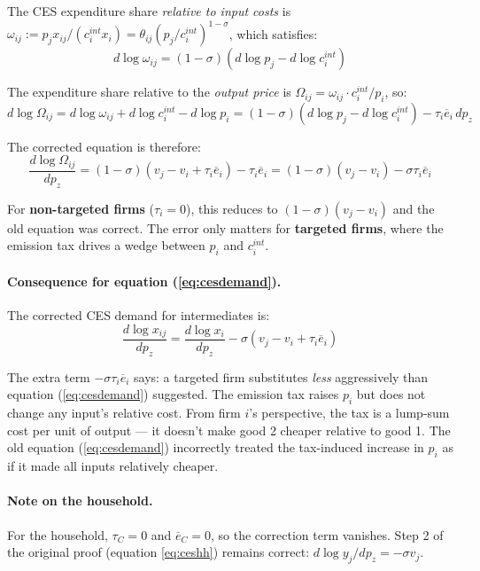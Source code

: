 \documentclass[11pt]{article}
\begin{document}
The CES expenditure share \textit{relative to input costs} is $\omega_{ij} := p_j x_{ij}/(c_i^{int} x_i) = \theta_{ij}(p_j/c_i^{int})^{1-\sigma}$, which satisfies:
$$d\log \omega_{ij} = (1-\sigma)(d\log p_j - d\log c_i^{int})$$

The expenditure share relative to the \textit{output price} is $\Omega_{ij} = \omega_{ij} \cdot c_i^{int}/p_i$, so:
$$d\log \Omega_{ij} = d\log \omega_{ij} + d\log c_i^{int} - d\log p_i = (1-\sigma)(d\log p_j - d\log c_i^{int}) - \tau_i\overline{e}_i\, dp_z$$

The corrected equation is therefore:
\begin{equation}
    \label{eq:dlogOmega_correct}
    \frac{d\log \Omega_{ij}}{dp_z} = (1-\sigma)(v_j - v_i + \tau_i\overline{e}_i) - \tau_i\overline{e}_i = (1-\sigma)(v_j - v_i) - \sigma\tau_i\overline{e}_i
\end{equation}

For \textbf{non-targeted firms} ($\tau_i = 0$), this reduces to $(1-\sigma)(v_j - v_i)$ and the old equation was correct. The error only matters for \textbf{targeted firms}, where the emission tax drives a wedge between $p_i$ and $c_i^{int}$.

\paragraph{Consequence for equation (\ref{eq:cesdemand}).}
The corrected CES demand for intermediates is:
\begin{equation}
    \label{eq:cesdemand_correct}
    \frac{d\log x_{ij}}{dp_z} = \frac{d\log x_i}{dp_z} - \sigma(v_j - v_i + \tau_i\overline{e}_i)
\end{equation}

The extra term $-\sigma\tau_i\overline{e}_i$ says: a targeted firm substitutes \textit{less} aggressively than equation (\ref{eq:cesdemand}) suggested. The emission tax raises $p_i$ but does not change any input's relative cost. From firm $i$'s perspective, the tax is a lump-sum cost per unit of output — it doesn't make good 2 cheaper relative to good 1. The old equation (\ref{eq:cesdemand}) incorrectly treated the tax-induced increase in $p_i$ as if it made all inputs relatively cheaper.

\paragraph{Note on the household.} For the household, $\tau_C = 0$ and $\overline{e}_C = 0$, so the correction term vanishes. Step 2 of the original proof (equation \ref{eq:ceshh}) remains correct: $d\log y_j / dp_z = -\sigma v_j$.
\end{document}
